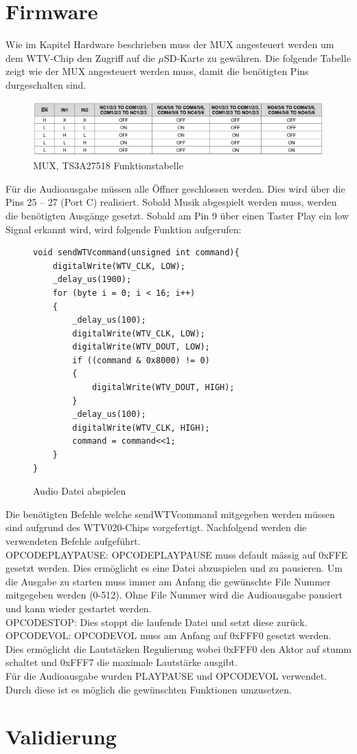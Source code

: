 \section{Firmware}
Wie im Kapitel Hardware beschrieben muss der MUX angesteuert werden um dem WTV-Chip den Zugriff auf die $\mu$SD-Karte zu gewähren. Die folgende Tabelle zeigt wie der MUX angesteuert werden muss, damit die benötigten Pins durgeschalten sind.

\begin{figure}[h]
	\centering
	\includegraphics[width=15cm]{Bilder/MuxTab.jpg}
	\caption{MUX, TS3A27518 Funktionstabelle}
	\label{MUX-Tabelle}
\end{figure}

Für die Audioausgabe müssen alle Öffner geschlossen werden. Dies wird über die Pins 25 – 27 (Port C) realisiert. Sobald Musik abgespielt werden muss, werden die benötigten Ausgänge gesetzt. Sobald am Pin 9 über einen Taster Play ein low Signal erkannt wird, wird folgende Funktion aufgerufen:
\begin{figure}[h]
	\begin{verbatim}
void sendWTVcommand(unsigned int command){
	digitalWrite(WTV_CLK, LOW);
	_delay_us(1900);
	for (byte i = 0; i < 16; i++)
	{
		_delay_us(100);
		digitalWrite(WTV_CLK, LOW);
		digitalWrite(WTV_DOUT, LOW);
		if ((command & 0x8000) != 0)
		{
			digitalWrite(WTV_DOUT, HIGH);
		}
		_delay_us(100);
		digitalWrite(WTV_CLK, HIGH);
		command = command<<1;
	}
}
	\end{verbatim}
	\caption{Audio Datei abspielen }
	\label{WTV-Play}
\end{figure}


Die benötigten Befehle welche sendWTVcommand mitgegeben werden müssen sind aufgrund des WTV020-Chips vorgefertigt.
\newpage Nachfolgend werden die verwendeten Befehle aufgeführt.\\
OPCODEPLAYPAUSE: OPCODEPLAYPAUSE muss default mässig auf 0xFFE gesetzt werden. Dies ermöglicht es eine Datei abzuspielen und zu pausieren. Um die Ausgabe zu starten muss immer am Anfang die gewünschte File Nummer mitgegeben werden (0-512). Ohne File Nummer wird die Audioausgabe pausiert und kann wieder gestartet werden.  \\
OPCODESTOP: Dies stoppt die laufende Datei und setzt diese zurück.\\
OPCODEVOL: OPCODEVOL muss am Anfang auf 0xFFF0 gesetzt werden. Dies ermöglicht die Lautstärken Regulierung wobei 0xFFF0 den Aktor auf stumm schaltet und 0xFFF7 die maximale Lautstärke ausgibt. \\
Für die Audioausgabe wurden PLAYPAUSE und OPCODEVOL verwendet. Durch diese ist es möglich die gewünschten Funktionen umzusetzen. 

\section{Validierung}